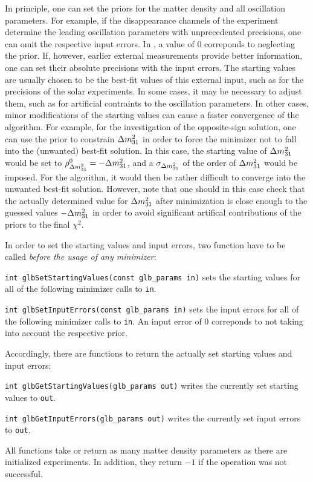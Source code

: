 In principle, one can set the priors for the matter density and all oscillation parameters. For example, if the disappearance channels of the experiment determine the leading oscillation parameters with unprecedented
precisions, one can omit the respective input errors. In \GLOBES , a
value of $0$ correponds to neglecting the prior. If, however, earlier external measurements provide better information, one can set their absolute precisions with the input errors. The starting values are usually chosen to be the best-fit values of this external input, such as
for the precisions of the solar experiments. In some cases, it may be
necessary to adjust them, such as for artificial contraints to the
oscillation parameters. In other cases, minor modifications of the starting values can cause a faster convergence of the algorithm.
For example, for the investigation of the
opposite-sign solution, one can use the prior to constrain $\Delta m_{31}^2$
in order to force the minimizer not to  fall into the (unwanted) best-fit solution. In this case, the starting value of $\Delta m_{31}^2$ would be set to $\rho^0_{\Delta m_{31}^2} = - \Delta m_{31}^2$, and a $\sigma_{\Delta m_{31}^2}$ of the order of $\Delta m_{31}^2$ would be imposed. For the algorithm, it would then be rather difficult 
to converge into the unwanted best-fit solution. However, note that one should in this case check that the actually determined value for $\Delta m_{31}^2$ after minimization is close enough to the guessed values $-\Delta m_{31}^2$ in order to avoid significant artifical contributions of the priors to the 
final $\chi^2$.

In order to set the starting values and input errors, two function have to
 be called {\em before the usage of any minimizer}:
\begin{function}
{\tt int glbSetStartingValues(const glb\_params in)} sets the starting values for all of the following minimizer calls to {\tt in}.
\end{function}
\begin{function}
{\tt int glbSetInputErrors(const glb\_params in)}
 sets the input errors for all of the following minimizer calls to {\tt in}.
 An input error of $0$ correponds to not taking into account the
 respective prior.
\end{function}
Accordingly, there are functions to return the actually set starting values
and input errors:
\begin{function}
{\tt int glbGetStartingValues(glb\_params out)} writes the currently
set starting values to {\tt out}.
\end{function}
\begin{function}
{\tt int glbGetInputErrors(glb\_params out)}
 writes the currently set input errors to {\tt out}.
\end{function}
All functions take or return as many matter density parameters as there are initialized experiments. In addition, they return $-1$ if the operation
was not successful.

